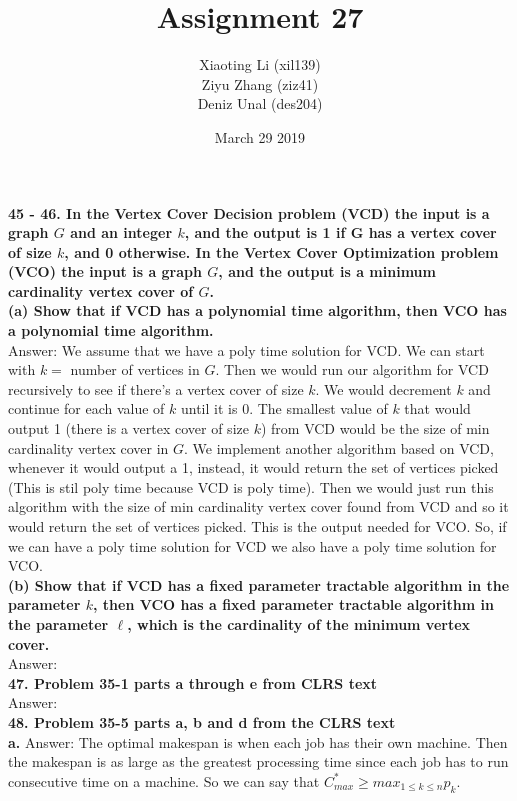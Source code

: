 \documentclass{article}
\title{Assignment 27}
\author{Xiaoting Li (xil139) \\
Ziyu Zhang (ziz41) \\
Deniz Unal (des204)}
\date{March 29 2019}
\begin{document}
\maketitle
\noindent
\textbf{45 - 46. In the Vertex Cover Decision problem (VCD) the input is a graph $G$ and an integer $k$, and the output is 1 if G has a vertex cover of size $k$, and 0 otherwise. In the Vertex Cover Optimization problem (VCO) the input is a graph $G$, and the output is a minimum cardinality vertex cover of $G$.} \\ \newline
\textbf{(a) Show that if VCD has a polynomial time algorithm, then VCO has a polynomial time algorithm.} \\ \newline
Answer: We assume that we have a poly time solution for VCD. We can start with $k =$ number of vertices in $G$. Then we would run our algorithm for VCD recursively to see if there's a vertex cover of size $k$. We would decrement $k$ and continue for each value of $k$ until it is 0. The smallest value of $k$ that would output 1 (there is a vertex cover of size $k$) from VCD would be the size of min cardinality vertex cover in $G$. We implement another algorithm based on VCD, whenever it would output a 1, instead, it would return the set of vertices picked (This is stil poly time because VCD is poly time). Then we would just run this algorithm with the size of min cardinality vertex cover found from VCD and so it would return the set of vertices picked. This is the output needed for VCO. So, if we can have a poly time solution for VCD we also have a poly time solution for VCO.\\ \newline
\textbf{(b) Show that if VCD has a fixed parameter tractable algorithm in the parameter $k$, then VCO has a fixed parameter tractable algorithm in the parameter $\ell$, which is the cardinality of the minimum vertex cover.} \\ \newline
Answer: \\ \newline
\textbf{47. Problem 35-1 parts a through e from CLRS text} \\ \newline
Answer: \\ \newline
\textbf{48. Problem 35-5 parts a, b and d from the CLRS text} \\ \newline
\textbf{a.}
Answer: The optimal makespan is when each job has their own machine. Then the makespan is as large as the greatest processing time since each job has to run consecutive time on a machine. So we can say that $C_{max}^{*} \geq max_{1\leq k \leq n}p_k$.\\ \newline
\end{document}
